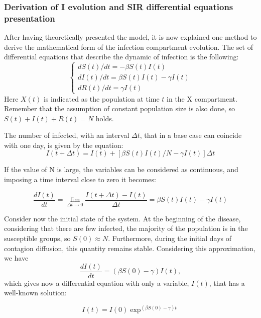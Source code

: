\subsubsection{Derivation of I evolution and SIR differential equations presentation}
After having theoretically presented the model, it is now explained one method to derive the mathematical form of the infection compartment evolution. 
The set of differential equations that  describe the dynamic of infection is the following:
\begin{equation}
	\begin{cases}
		dS(t) / dt = -\beta S(t) I(t)\\
		dI(t) / dt = \beta S(t) I(t) - \gamma I(t)\\
		dR(t) / dt =  \gamma I(t)
	\end{cases}
\end{equation}
Here $X(t)$ is indicated as the population at time $t$ in the X compartment. Remember that the assumption of constant population size is also done, so $S(t)+I(t)+R(t) = N$ holds.

The number of infected, with an interval  $\Delta t$, that in a base case can coincide with one day, is given by the equation:
\begin{equation}
	I(t+\Delta t) = I(t) + [\beta S(t)I(t)/N - \gamma I(t)]\Delta t
\end{equation}

If the value of N is large, the variables can be considered as continuous, and imposing a time interval close to zero it becomes:

\begin{equation}
	\frac{d I(t)}{dt} = \lim_{\Delta t \rightarrow  0} \frac{I(t+\Delta t)-I(t)}{\Delta t} = \beta S(t) I(t)- \gamma I(t)
\end{equation}

Consider now the initial state of the system. At the beginning of the disease, considering that there are few infected, the majority of the population is in the susceptible groups, so $S(0) \approx N$. Furthermore, during the initial days of contagion diffusion, this quantity remains stable. Considering this approximation, we have 
\begin{equation}
	\frac{d I(t)}{dt} = (\beta S(0)-\gamma)I(t),
\end{equation} 
which gives now a differential equation with only a variable, $I(t)$, that has a well-known solution:

\begin{equation}
	I(t) = I(0) \exp ^{(\beta S(0)- \gamma)t}
	\label{eqn:sol_I}
\end{equation}



